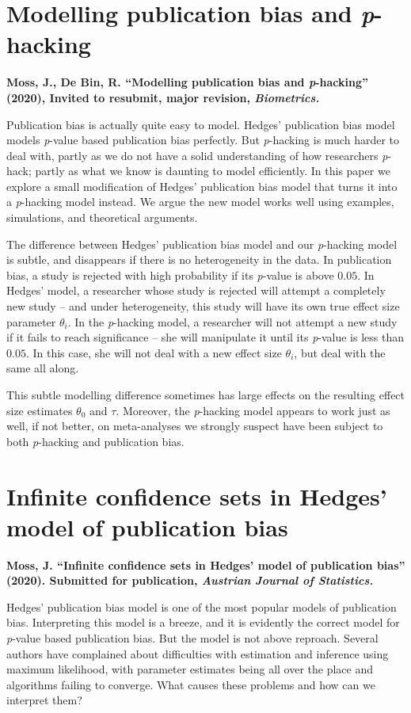 \section{Modelling publication bias and \emph{p}-hacking}
\textbf{Moss, J., De Bin, R. ``Modelling publication bias and \emph{p}-hacking''
(2020), Invited to resubmit, major revision, \emph{Biometrics.}}

Publication bias is actually quite easy to model. Hedges' publication bias model \parencite{Hedges1992-ue} models \textit{p}-value based publication bias perfectly. But \textit{p}-hacking is much harder to deal with, partly as we do not have a solid understanding of how researchers \textit{p}-hack; partly as what we know is daunting to model efficiently. In this paper we explore a small modification of Hedges' publication bias model that turns it into a \textit{p}-hacking model instead. We argue the new model works well using examples, simulations, and theoretical arguments. 

The difference between Hedges' publication bias model and our \textit{p}-hacking model is subtle, and disappears if there is no heterogeneity in the data. In publication bias, a study is rejected with high probability if its \textit{p}-value is above $0.05$. In Hedges' model, a researcher whose study is rejected will attempt a completely new study -- and under heterogeneity, this study will have its own true effect size parameter $\theta_i$. In the \textit{p}-hacking model, a researcher will not attempt a new study if it fails to reach significance -- she will manipulate it until its \textit{p}-value is less than $0.05$. In this case, she will not deal with a new effect size $\theta_i$, but deal with the same all along.

This subtle modelling difference sometimes has large effects on the resulting effect size estimates $\theta_0$ and $\tau$. Moreover, the \textit{p}-hacking model appears to work just as well, if not better, on meta-analyses we strongly suspect have been subject to both \textit{p}-hacking and publication bias.

\section{Infinite confidence sets in Hedges' model of publication
bias}
\textbf{Moss, J. ``Infinite confidence sets in Hedges' model of publication
bias'' (2020). Submitted for publication, \emph{Austrian Journal of Statistics.}
}

Hedges' publication bias model is one of the most popular models of publication bias. Interpreting this model is a breeze, and it is evidently the correct model for \textit{p}-value based publication bias. But the model is not above reproach. Several authors have complained about difficulties with estimation and inference using maximum likelihood, with parameter estimates being all over the place and algorithms failing to converge. What causes these problems and how can we interpret them?

